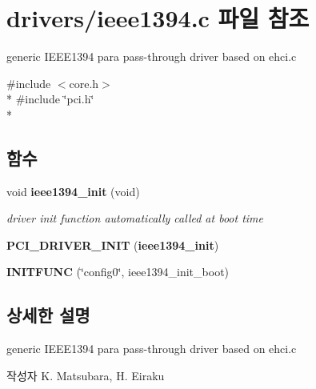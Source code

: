 \section{drivers/ieee1394.c 파일 참조}
\label{ieee1394_8c}


generic I\-E\-E\-E1394 para pass-\/through driver based on ehci.\-c  


{\ttfamily \#include $<$core.\-h$>$}\\*
{\ttfamily \#include \char`\"{}pci.\-h\char`\"{}}\\*
\subsection*{함수}
\begin{DoxyCompactItemize}
\item 
void {\bf ieee1394\-\_\-init} (void)\label{ieee1394_8c_affa77df568604658406553aa2b46aef2}

\begin{DoxyCompactList}\small\item\em driver init function automatically called at boot time \end{DoxyCompactList}\item 
{\bfseries P\-C\-I\-\_\-\-D\-R\-I\-V\-E\-R\-\_\-\-I\-N\-I\-T} ({\bf ieee1394\-\_\-init})\label{ieee1394_8c_a3de491c24d608d30d7b808f485461fcb}

\item 
{\bfseries I\-N\-I\-T\-F\-U\-N\-C} (\char`\"{}config0\char`\"{}, ieee1394\-\_\-init\-\_\-boot)\label{ieee1394_8c_a5bfa7511f1154c45d4052d703ea5c1dc}

\end{DoxyCompactItemize}


\subsection{상세한 설명}
generic I\-E\-E\-E1394 para pass-\/through driver based on ehci.\-c \begin{DoxyAuthor}{작성자}
K. Matsubara, H. Eiraku 
\end{DoxyAuthor}
